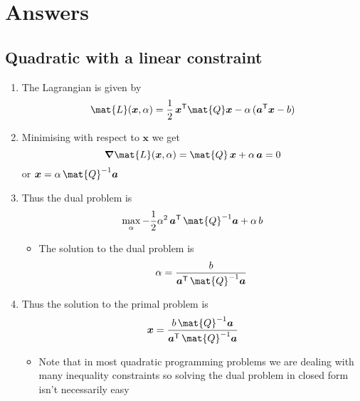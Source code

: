 \documentclass[11pt]{article}
\newcommand{\tr}{\textsf{T}}
\newcommand{\grad}{\bm{\nabla}}
\begin{document}
\section{Answers}
\label{sec:orgd89063c}

\subsection{Quadratic with a linear constraint}
\label{sec:orgbf5bcb5}
\begin{enumerate}
\item The Lagrangian is given by
$$ \mat{L}(\bm{x},\alpha) = \frac{1}{2}\, \bm{x}^\tr \mat{Q}
      \bm{x} - \alpha \,(\bm{a}^\tr\bm{x} - b) $$
\item Minimising with respect to \(\bm{x}\) we get
$$ \grad  \mat{L}(\bm{x},\alpha) =  \mat{Q}\,  \bm{x} + \alpha\,
      \bm{a} = 0 $$
or \(\bm{x} = \alpha\, \mat{Q}^{-1} \bm{a}\)
\item Thus the dual problem is
$$ \max_\alpha - \frac{1}{2} \alpha^2 \, \bm{a}^\tr\, \mat{Q}^{-1}\bm{a} + \alpha\,b $$
\begin{itemize}
\item The solution to the dual problem is
$$ \alpha = \frac{b}{\bm{a}^\tr\, \mat{Q}^{-1}\bm{a}} $$
\end{itemize}
\item Thus the solution to the primal problem is
$$ \bm{x} = \frac{b\, \mat{Q}^{-1} \bm{a}}{\bm{a}^\tr\,
      \mat{Q}^{-1}\bm{a}} $$
\begin{itemize}
\item Note that in most quadratic programming problems we are dealing
with many inequality constraints so solving the dual problem in
closed form isn't necessarily easy
\end{itemize}
\end{enumerate}
\end{document}
